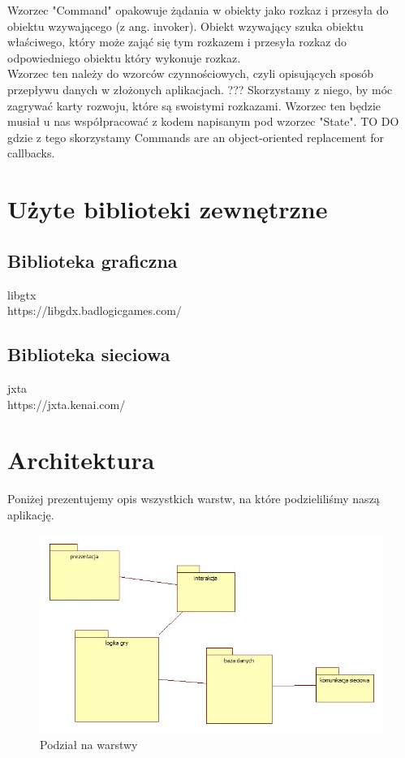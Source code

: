 \documentclass[a4paper, 11pt]{article}
\begin{document}
	Wzorzec "Command" opakowuje żądania w obiekty jako rozkaz i przesyła do obiektu wzywającego (z ang. invoker). Obiekt wzywający szuka obiektu właściwego, który może zająć się tym rozkazem i   przesyła rozkaz do odpowiedniego obiektu który wykonuje rozkaz.\\  
	Wzorzec ten należy do wzorców czynnościowych, czyli opisujących sposób przepływu danych w złożonych aplikacjach.%
	??? Skorzystamy z niego, by móc zagrywać karty rozwoju, które są swoistymi rozkazami. Wzorzec ten będzie musiał u nas współpracować z kodem napisanym pod wzorzec "State". %
	TO DO gdzie z tego skorzystamy
	Commands are an object-oriented replacement for callbacks.\\
	\section{Użyte biblioteki zewnętrzne}
	\subsection{Biblioteka graficzna}
	libgtx\\
	 https://libgdx.badlogicgames.com/
	\subsection{Biblioteka sieciowa}
	jxta\\
	https://jxta.kenai.com/
	\section{Architektura}
	\indent
	
	Poniżej prezentujemy opis wszystkich warstw, na które podzieliliśmy naszą aplikację.
	\begin{figure}[H]%
		\includegraphics[scale=0.5]{uml/main.jpg}\caption{Podział na warstwy}
	\end{figure}
\end{document}
